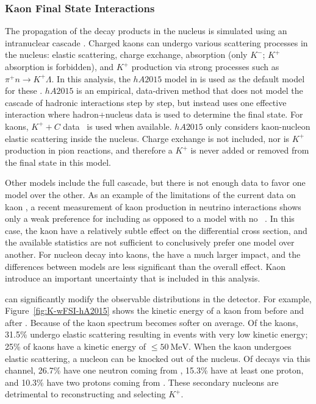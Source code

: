 \subsubsection{Kaon Final State Interactions}
\label{sec:final-state-interactions}

The propagation of the decay products in the nucleus is simulated using an intranuclear cascade . 
Charged kaons can undergo various scattering processes in the nucleus: elastic scattering, charge exchange, absorption (only $K^{-}$; $K^{+}$ absorption is forbidden), and $K^{+}$ production via strong processes such as $\pi^{+}n \rightarrow K^{+} \Lambda$.  In this analysis, the $hA2015$ model in  is used as the default model for these .  $hA2015$ is an empirical, data-driven method that does not model the cascade of hadronic interactions step by step, but instead uses one effective interaction where hadron+nucleus data is used to determine the final state.
For kaons, $K^{+}+C$ data~\cite{Bugg:1968zz,Friedman:1997eq}
is used when available. $hA2015$ only considers kaon-nucleon elastic scattering inside the nucleus.  Charge exchange is not included, nor is $K^+$ production in pion reactions, and therefore a $K^+$ is never added or removed from the final state in this model. 

Other  models include the full cascade, but there is not enough data to favor one model over the other.  As an example of the limitations of the current data on kaon , a recent measurement of kaon production in neutrino interactions shows only a weak preference for including  as opposed to a model with no ~\cite{Marshall:2016rrn}.  In this case, the kaon  have a relatively subtle effect on the differential cross section, and the available statistics are not sufficient to conclusively prefer one model over another.  For nucleon decay into kaons, the  have a much larger impact, and the differences between models are less significant than the overall effect.  Kaon  introduce an important uncertainty that is included in this analysis.

 can significantly modify the observable distributions in the detector.  For example, Figure~\ref{fig:K-wFSI-hA2015} shows the kinetic energy of a kaon from \ptoknubar before and after . Because of  the kaon spectrum becomes softer on average. Of the kaons, \num{31.5}\%  undergo elastic scattering resulting in events with very low kinetic energy;  \num{25}\% of kaons have a kinetic energy of $\le\SI{50}{\MeV}$. When the kaon undergoes elastic scattering, a nucleon can be knocked out of the nucleus. Of decays via this channel, \num{26.7}\%  have one neutron coming from , \num{15.3}\% have at least one proton, and \num{10.3}\% have two protons coming from . These secondary nucleons are detrimental to reconstructing and selecting  $K^{+}$.

